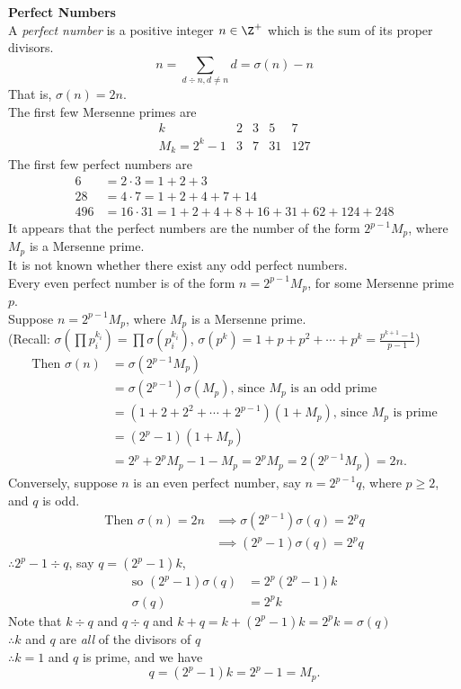 \textbf{Perfect Numbers} \\
 A \emph{perfect number} is a positive integer $n\in\Z^+$ which is the sum of its proper divisors.
\[ n = \sum_{d\div n,d\neq n}d = \sigma(n) - n \]
That is, $\sigma(n)=2n$. \\
The first few Mersenne primes are
\[ \begin{array}{c|cccc}
k & 2 & 3 & 5 & 7 \\ \hline
M_k=2^k-1 & 3 & 7 & 31 & 127
\end{array}
\]
The first few perfect numbers are
\begin{align*}
6 &= 2\cdot3 = 1+2+3 \\
28 &= 4\cdot7 = 1+2+4+7+14 \\
496 &= 16\cdot31 = 1+2+4+8+16+31+62+124+248 
\end{align*}
It appears that the perfect numbers are the number of the form $2^{p-1}M_p$, where $M_p$ is a Mersenne prime. \\
\remark It is not known whether there exist any odd perfect numbers. \\
\thm Every even perfect number is of the form $n=2^{p-1}M_p$, for some Mersenne prime $p$. \\
\pf Suppose $n=2^{p-1}M_p$, where $M_p$ is a Mersenne prime. \\
(Recall: $\sigma(\prod p_i^{k_i})=\prod\sigma(p_i^{k_i})$, $\sigma(p^k)=1+p+p^2+\dotsb+p^k=\frac{p^{k+1}-1}{p-1}$)
\begin{align*}
\text{Then } \sigma(n) &= \sigma(2^{p-1}M_p) \\
&= \sigma(2^{p-1})\sigma(M_p) \text{, since $M_p$ is an odd prime} \\
&= (1+2+2^2+\dotsb+2^{p-1})(1+M_p) \text{, since $M_p$ is prime} \\
&= (2^p-1)(1+M_p) \\
&= 2^p + 2^p M_p - 1 - M_p = 2^p M_p = 2 (2^{p-1}M_p) = 2n .
\end{align*}
Conversely, suppose $n$ is an even perfect number, say $n=2^{p-1}q$, where $p\geq2$, and $q$ is odd.
\begin{align*}
\text{Then } \sigma(n) = 2n &\implies \sigma(2^{p-1})\sigma(q) = 2^p q \\
&\implies (2^p-1)\sigma(q) = 2^p q
\end{align*}
$\therefore 2^p-1\div q$, say $q=(2^p-1)k$,
\begin{align*}
\text{so } (2^p-1)\sigma(q) &= 2^p(2^p-1)k \\
\sigma(q) &= 2^p k
\end{align*}
Note that $k\div q$ and $q\div q$ and $k+q=k+(2^p-1)k=2^pk=\sigma(q)$ \\
$\therefore k$ and $q$ are \emph{all} of the divisors of $q$ \\
$\therefore k=1$ and $q$ is prime, and we have
\[ q = (2^p-1)k = 2^p-1 = M_p . \]
